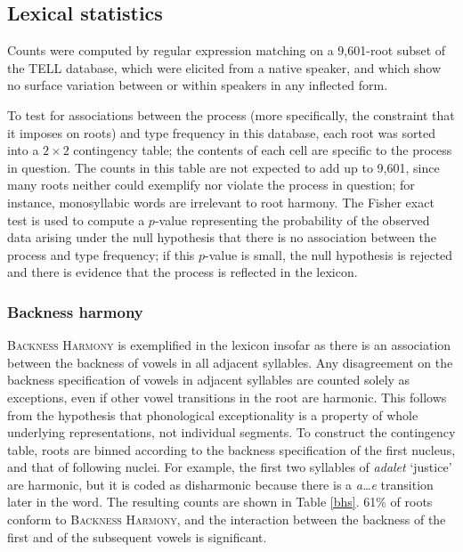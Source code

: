 \subsection{Lexical statistics}

Counts were computed by regular expression matching on a 9,601-root subset of the TELL database, which were elicited from a native speaker, and which show no surface variation between or within speakers in any inflected form.

To test for associations between the process (more specifically, the constraint that it imposes on roots) and type frequency in this database, each root was sorted into a $2 \times 2$ contingency table; the contents of each cell are specific to the process in question. The counts in this table are not expected to add up to 9,601, since many roots neither could exemplify nor violate the process in question; for instance, monosyllabic words are irrelevant to root harmony. The Fisher exact test is used to compute a $p$-value representing the probability of the observed data arising under the null hypothesis that there is no association between the process and type frequency; if this $p$-value is small, the null hypothesis is rejected and there is evidence that the process is reflected in the lexicon. 

\subsubsection{Backness harmony}

\textsc{Backness Harmony} is exemplified in the lexicon insofar as there is an association between the backness of vowels in all adjacent syllables. Any disagreement on the backness specification of vowels in adjacent syllables are counted solely as exceptions, even if other vowel transitions in the root are harmonic. This follows from the hypothesis that phonological exceptionality is a property of whole underlying representations, not individual segments. To construct the contingency table, roots are binned according to the backness specification of the first nucleus, and that of following nuclei. For example, the first two syllables of \emph{adalet} `justice' are harmonic, but it is coded as disharmonic because there is a \emph{a\ldots{}e} transition later in the word. The resulting counts are shown in Table \ref{bhs}. 61\% of roots conform to \textsc{Backness Harmony}, and the interaction between the backness of the first and of the subsequent vowels
is significant.

